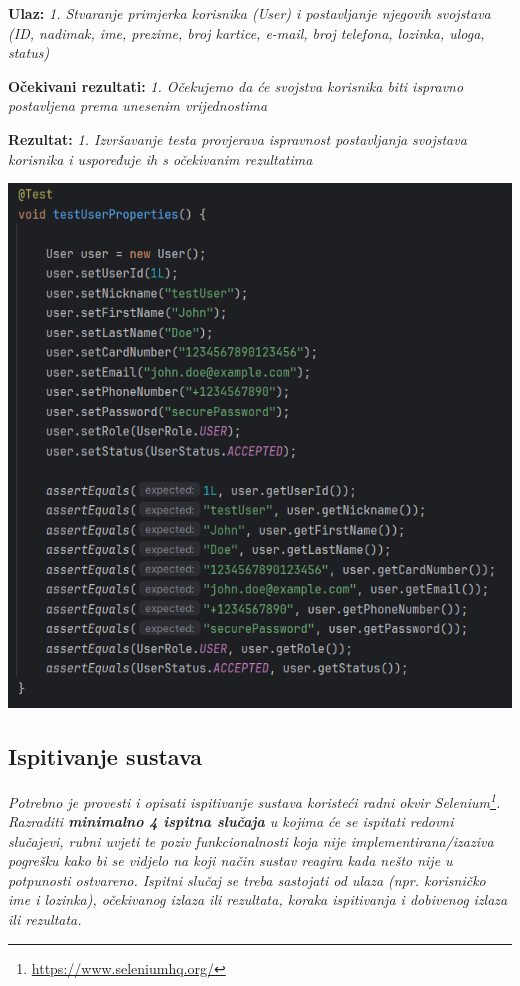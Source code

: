                                                                                     \textbf{Ulaz:}
                                                                                    \textit{1. Stvaranje primjerka korisnika (User) i postavljanje njegovih svojstava (ID, nadimak, ime, prezime, broj kartice, e-mail, broj telefona, lozinka, uloga, status)}

                                                                                    \textbf{Očekivani rezultati:}
                                                                                    \textit{1. Očekujemo da će svojstva korisnika biti ispravno postavljena prema unesenim vrijednostima}

                                                                                    \textbf{Rezultat:}
                                                                                    \textit{1. Izvršavanje testa provjerava ispravnost postavljanja svojstava korisnika i uspoređuje ih s očekivanim rezultatima}


            \includegraphics[width=1\linewidth]{slike/UserTest.png}



			\subsection{Ispitivanje sustava}
						 \textit{Potrebno je provesti i opisati ispitivanje sustava koristeći radni okvir Selenium\footnote{\url{https://www.seleniumhq.org/}}. Razraditi \textbf{minimalno 4 ispitna slučaja} u kojima će se ispitati redovni slučajevi, rubni uvjeti te poziv funkcionalnosti koja nije implementirana/izaziva pogrešku kako bi se vidjelo na koji način sustav reagira kada nešto nije u potpunosti ostvareno. Ispitni slučaj se treba sastojati od ulaza (npr. korisničko ime i lozinka), očekivanog izlaza ili rezultata, koraka ispitivanja i dobivenog izlaza ili rezultata.\\ }
			 
